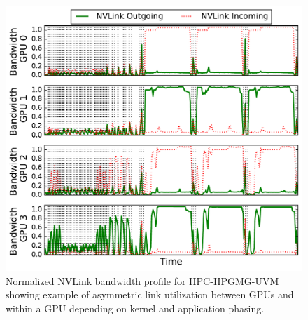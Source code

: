 




\begin{figure}[t]
    \centering
    \includegraphics[width=1.0\columnwidth]{figures/bw_profile_HPGMG_UVM_base.pdf}
    \caption{Normalized NVLink bandwidth profile for HPC-HPGMG-UVM showing example of asymmetric 
    link utilization between GPUs and within a GPU depending on kernel and application phasing.}
    \label{fig:link-motivation}
\end{figure}

